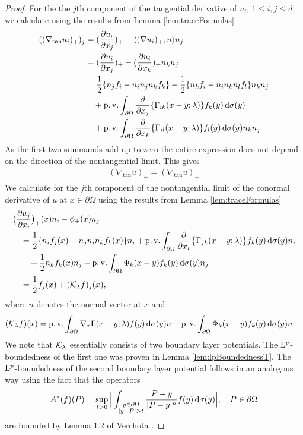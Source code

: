 \begin{proof}
  For the the $j$th component of the tangential derivative of $u_i$, $1\leq i,j \leq d$, we calculate using the results from Lemma \ref{lem:traceFormulas}
  \begin{align*}
    ((\nabla_{\mathrm{tan}} u_i)_+)_j
    &= (\frac{\partial u_i}{\partial x_j})_+ - \langle (\nabla u_i)_+, n \rangle n_j \\
    &= (\frac{\partial u_i}{\partial x_j} )_+ - (\frac{\partial u_i}{\partial x_k} )_+ n_k n_j \\
    &= \frac{1}{2} \{ n_j f_i - n_i n_j n_k f_k\} - \frac{1}{2} \{ n_k f_i - n_i n_k n_l f_l \} n_k n_j  \\
    &\quad+ \operatorname{p. v.} \int_{\partial\Omega} \frac{\partial}{\partial x_j} \{ \Gamma_{ik} (x - y; \lambda) \} f_k(y) \, {\operatorname{d}\!{\sigma}}(y) \\
    &\quad+ \operatorname{p. v.} \int_{\partial\Omega} \frac{\partial}{\partial x_k} \{ \Gamma_{il} (x - y; \lambda) \} f_l(y) \, {\operatorname{d}\!{\sigma}}(y) n_k n_j.
  \end{align*}
  As the first two summands add up to zero the entire expression does not depend on the direction of the nontangential limit. 
  This gives
  \begin{align*}
    (\nabla_{\mathrm{tan}} u)_+ = (\nabla_{\mathrm{tan}} u)_-
  \end{align*}
  We calculate for the $j$th component of the nontangential limit of the conormal derivative of $u$ at $x \in \partial\Omega$ using the results from Lemma \ref{lem:traceFormulas}
  \begin{align*}
    &\big(\frac{\partial u_j}{\partial x_i}\big)_+(x) n_i - \phi_+(x) n_j\\
    &\quad= \frac{1}{2} \{ n_i f_j(x) - n_j n_i n_k f_k(x) \} n_i + \operatorname{p. v.} \int_{\partial\Omega} \frac{\partial}{\partial{x_i}} \big\{ \Gamma_{jk}(x - y; \lambda) \big\} f_k(y) \, {\operatorname{d}\!{\sigma}}(y) n_i \\
    &\qquad+ \frac{1}{2} n_k f_k(x) n_j - \operatorname{p. v.} \int_{\partial\Omega} \Phi_k(x - y) f_k(y) \, {\operatorname{d}\!{\sigma}}(y) n_j \\
    &\quad= \frac{1}{2} f_j(x) + (\mathcal{K}_\lambda f)_j(x),
  \end{align*}
  where $n$ denotes the normal vector at $x$ and
  \begin{align}
    \label{eq:defnKlambda}
    (\mathcal{K}_\lambda f) (x)
    &= \operatorname{p. v.} \int_{\partial\Omega} \nabla_x \Gamma(x - y; \lambda)  f(y) \, {\operatorname{d}\!{\sigma}}(y) n - \operatorname{p. v.} \int_{\partial\Omega} \Phi_k(x - y) f_k(y) \, {\operatorname{d}\!{\sigma}}(y) n.
  \end{align}
  We note that $\mathcal{K}_\lambda$ essentially consists of two boundary layer potentials. 
  The $\mathrm{L}^p$-boundedness of the first one was proven in Lemma \ref{lem:lpBoundednessT}.
  The $\mathrm{L}^p$-boundedness of the second boundary layer potential follows in an analogous way using the fact that the operators
  \begin{align*}
    A^*(f)(P) = \sup_{t > 0} \Big| \int_{\substack{y \in \partial\Omega \\ |y - P| > t}} \frac{P - y}{|P - y|^n} f(y) \, {\operatorname{d}\!{\sigma}}(y)\Big| , \quad P \in \partial\Omega
  \end{align*}
  are bounded by Lemma 1.2 of Verchota \cite{verchotaDiss}.
\end{proof}

